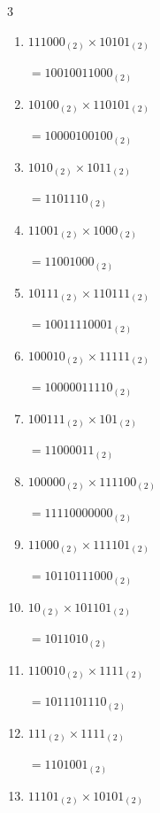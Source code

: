 \begin{multicols}{3}
\begin{enumerate}
  \itemsep=100pt
  \item $111000_{(2)} \times 10101_{(2)}$

        $=10010011000_{(2)}$

  \item $10100_{(2)} \times 110101_{(2)}$

        $=10000100100_{(2)}$

  \item $1010_{(2)} \times 1011_{(2)}$

        $=1101110_{(2)}$

  \item $11001_{(2)} \times 1000_{(2)}$

        $=11001000_{(2)}$

  \item $10111_{(2)} \times 110111_{(2)}$

        $=10011110001_{(2)}$

\columnbreak %

  \item $100010_{(2)} \times 11111_{(2)}$

        $=10000011110_{(2)}$

  \item $100111_{(2)} \times 101_{(2)}$

        $=11000011_{(2)}$

  \item $100000_{(2)} \times 111100_{(2)}$

        $=11110000000_{(2)}$

  \item $11000_{(2)} \times 111101_{(2)}$

        $=10110111000_{(2)}$

  \item $10_{(2)} \times 101101_{(2)}$

        $=1011010_{(2)}$

\columnbreak %

  \item $110010_{(2)} \times 1111_{(2)}$

        $=1011101110_{(2)}$

  \item $111_{(2)} \times 1111_{(2)}$

        $=1101001_{(2)}$

  \item $11101_{(2)} \times 10101_{(2)}$


\end{enumerate}
\end{multicols}
